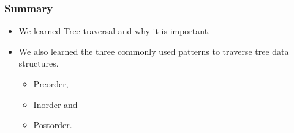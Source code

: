 \documentclass{beamer}
\begin{document}
\begin{frame}
\frametitle{Summary}
\begin{itemize}
\item We learned Tree traversal and why it is important.
\item We also learned  the three commonly used patterns to traverse tree data structures.
\begin{itemize}
\item Preorder,
\item Inorder and
\item Postorder.
\end{itemize}
\end{itemize}
\end{frame}
\end{document}
